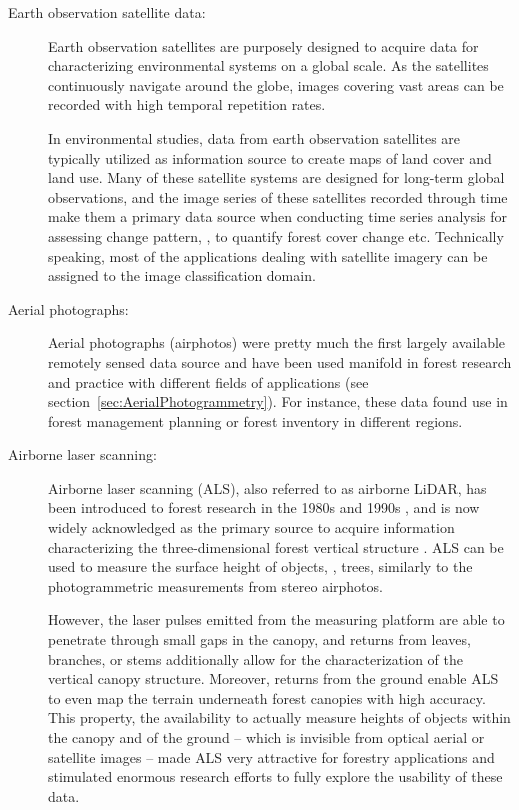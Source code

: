 \begin{description}
	\item [Earth observation satellite data:] Earth observation satellites are purposely 
		designed to acquire data for characterizing environmental systems on a global scale.
		As the satellites continuously navigate around the globe, images covering vast areas can be recorded with high temporal repetition rates. 
		
		In environmental studies, data from earth observation satellites are typically utilized as information source to create maps of land cover and land use.
		Many of these satellite systems are designed for long-term global observations,
		 and the image series of these satellites recorded through time make them a primary data source when conducting time series analysis for assessing change pattern,
		 \eg, to quantify forest cover change etc. 
		Technically speaking, most of the applications dealing with satellite imagery can be assigned to the image classification domain. 

	\item [Aerial photographs:] Aerial photographs (airphotos) were pretty much the first largely available remotely sensed data source
		 and have been used manifold in forest research
		 and practice with different fields of applications (see section~\ref{sec:AerialPhotogrammetry}). For instance, these data found use in 
		 forest management planning or forest inventory in different regions.
		  
	\item[Airborne laser scanning:] Airborne laser scanning (\acs{ALS}), 
		also referred to as airborne \ac{LiDAR}, has been introduced to 
		forest research in the 1980s and 1990s \parencite{Nelson.2013},
		and is now widely acknowledged as the primary source to acquire information characterizing the three-dimensional
		forest vertical structure \parencite{Lim.2003, Maltamo.2014b}.
		\ac{ALS} can be used to measure the surface height of objects, \eg, trees, similarly to the photogrammetric measurements from stereo airphotos. 
		
		However, the laser pulses emitted from the measuring platform are able to penetrate through small gaps in the canopy, 
		and returns from leaves, branches, or stems
		additionally allow for the characterization of the vertical canopy structure. 
		Moreover, returns from the ground enable \ac{ALS} to even map the terrain underneath forest canopies with high accuracy. 
		This property, the availability to actually measure heights of objects within the canopy and of the ground -- which is invisible from optical 
		aerial or satellite images --
		made \ac{ALS} very attractive for forestry applications and stimulated enormous research efforts to fully explore the usability of these data. 

\end{description}



